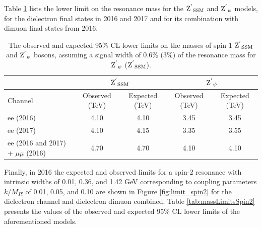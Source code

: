 \medskip
Table \ref{tab:massLimitsSpin1} lists the lower limit on the resonance mass for the $\mathrm{Z^{'}}_\mathrm{SSM}$ and $\mathrm{Z^{'}}_\mathrm{\psi}$ models, for the dielectron final states in 2016 and 2017 and for its combination with dimuon final states from 2016.

\begin{table}[!htb]
\begin{center}
\begin{tabular}{|l|c|c|c|c|}
\hline
\multicolumn{1}{|l|}{}  & \multicolumn{2}{c|}{$\mathrm{Z^{'}}_\mathrm{SSM}$} & \multicolumn{2}{c|}{$\mathrm{Z^{'}}_\mathrm{\psi}$}  \\
\hline
Channel             & Observed (TeV) & Expected (TeV)      & Observed (TeV)  & Expected (TeV)      \\\hline
ee (2016)           &  4.10      & 4.10            & 3.45        & 3.45            \\
ee (2017)           &  4.10      & 4.15            & 3.35        & 3.55            \\
ee (2016 and 2017) + $\mu\mu$ (2016)        &  4.70      & 4.70            & 4.10        & 4.10            \\
\hline
\end{tabular}
\caption{The observed and expected 95\% CL lower limits on the masses of spin 1 $\mathrm{Z^{'}}_\mathrm{SSM}$ and $\mathrm{Z^{'}}_\mathrm{\psi}$ bosons, assuming a signal width of 0.6\% (3\%) of the resonance mass for $\mathrm{Z^{'}}_\mathrm{\psi}$ ($\mathrm{Z^{'}}_\mathrm{SSM}$). }
\label{tab:massLimitsSpin1}
\end{center}
\end{table}

Finally, in 2016 the expected and observed limits for a spin-2 resonance with intrinsic widths of 0.01, 0.36, and 1.42 GeV corresponding to coupling parameters $k/\overline{M}_{Pl}$ of 0.01, 0.05, and 0.10 are shown in Figure \ref{fig:limit_spin2} for the dielectron channel and dielectron dimuon combined. Table \ref{tab:massLimitsSpin2} presents the values of the observed and expected 95\% CL lower limits of the aforementioned models.


